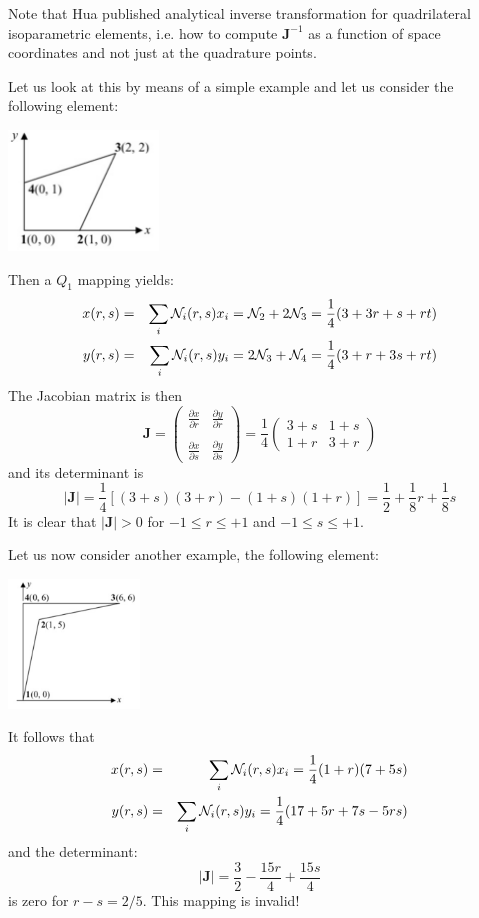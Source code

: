 Note that Hua \cite{hua90} published analytical inverse transformation for quadrilateral
isoparametric elements, i.e. how to compute ${\bm J}^{-1}$ as a function of space coordinates
and not just at the quadrature points. 

Let us look at this by means of a simple example and let us consider the following 
element:
\begin{center}
\includegraphics[width=4cm]{images/mappings/fournode/ex1}
\end{center}
Then a $Q_1$ mapping yields:
\begin{eqnarray}
x(r,s) &=& \sum_i {\mathcal{N}}_i(r,s) x_i = {\mathcal{N}}_2 + 2{\mathcal{N}}_3 = \frac{1}{4} (3+3r+ s+rt) \\
y(r,s) &=& \sum_i {\mathcal{N}}_i(r,s) y_i = 2{\mathcal{N}}_3 + {\mathcal{N}}_4 = \frac{1}{4} (3+r+ 3s+rt) 
\end{eqnarray}
The Jacobian matrix is then
\begin{equation}
{\bm J} = 
\left(
\begin{array}{cc}
\frac{\partial x}{\partial r} & \frac{\partial y}{\partial r} \nonumber\\ \\
\frac{\partial x}{\partial s} & \frac{\partial y}{\partial s} \nonumber
\end{array}
\right)
=
\frac{1}{4}
\left(
\begin{array}{cc}
3+s & 1+s \\
1+r & 3+r
\end{array}
\right)
\end{equation}
and its determinant is 
\begin{equation}
|{\bm J}|=\frac{1}{4} [(3+s)(3+r)-(1+s)(1+r)]=\frac{1}{2}+\frac{1}{8}r+\frac{1}{8}s
\end{equation}
It is clear that $|{\bm J}|>0$ for $-1\leq r \leq +1$ and $-1\leq s \leq +1$. 

Let us now consider another example, the following element:
\begin{center}
\includegraphics[width=3.5cm]{images/mappings/fournode/ex2}
\end{center}
It follows that
\begin{eqnarray}
x(r,s) &=& \sum_i {\mathcal{N}}_i(r,s) x_i = \frac{1}{4}(1+r)(7+5s) \\ 
y(r,s) &=& \sum_i {\mathcal{N}}_i(r,s) y_i = \frac{1}{4}(17+5r+7s-5rs)
\end{eqnarray}
and the determinant:
\[
|{\bm J}|=\frac{3}{2}-\frac{15r}{4}+\frac{15s}{4}
\]
is zero for $r-s=2/5$. This mapping is invalid!

